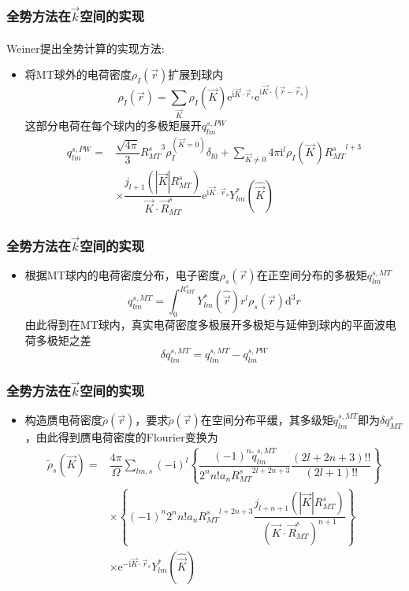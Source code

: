 \documentclass[cjk,slidestop,compress,mathserif,blue]{beamer}
\newcommand{\upcite}[1]{\hspace{0ex}\textsuperscript{\cite{#1}}} %
\begin{document}
\frame
{
	\frametitle{全势方法在$\vec k$空间的实现}
\textrm{Weiner}提出全势计算的实现方法\upcite{JMP22-2433_1981}:~\\
\begin{itemize}
	\item 将\textrm{MT}球外的电荷密度$\rho_I(\vec r)$扩展到球内
	\begin{displaymath}
		\rho_I(\vec r)=\sum_{\vec K}\rho_I(\vec K)\mathrm{e}^{\mathrm{i}\vec K\cdot\vec r_s}\mathrm{e}^{\mathrm{i}\vec K\cdot(\vec r-\vec r_s)}
	\end{displaymath}
	这部分电荷在每个球内的多极矩展开$q_{lm}^{s,PW}$
	\begin{displaymath}
		\begin{aligned}
			q_{lm}^{s,PW}=&\dfrac{\sqrt{4\pi}}3{R_{MT}^s}^3\rho_I^{(\vec K=0)}\delta_{l0}+\sum_{\vec K\neq0}4\pi\mathrm{i}^l\rho_I(\vec K){R_{MT}^s}^{l+3}\\
			&\times\dfrac{j_{l+1}(|\vec K|R_{MT}^s)}{\vec K\cdot\vec R_{MT}^s}\mathrm{e}^{\mathrm{i}\vec K\cdot\vec r_s}Y_{lm}^{\ast}(\hat{\vec K})
		\end{aligned}
	\end{displaymath}
\end{itemize}
}

\frame
{
	\frametitle{全势方法在$\vec k$空间的实现}
\begin{itemize}
	\item 根据\textrm{MT}球内的电荷密度分布，电子密度$\rho_s(\vec r)$在正空间分布的多极矩$q_{lm}^{s,MT}$
\begin{displaymath}
	q_{lm}^{s,MT}=\int_0^{R_{MT}^s}Y_{lm}^{\ast}(\hat{\vec r})r^l\rho_s(\vec r)\mathrm{d}^3r
\end{displaymath}
由此得到在\textrm{MT}球内，真实电荷密度多极展开多极矩与延伸到球内的平面波电荷多极矩之差
	\begin{displaymath}
		\delta q_{lm}^{s,MT}=q_{lm}^{s,MT}-q_{lm}^{s,PW}
	\end{displaymath}
\end{itemize}
}

\frame
{
	\frametitle{全势方法在$\vec k$空间的实现}
\begin{itemize}
	\item 构造赝电荷密度$\tilde\rho(\vec r)$，要求$\tilde\rho(\vec r)$在空间分布平缓，其多级矩$\tilde q_{lm}^{s,MT}$即为$\delta q_{MT}^s$，由此得到赝电荷密度的\textrm{Flourier}变换为
	\begin{displaymath}
		\begin{aligned}
			\tilde\rho_s(\vec K)=&\dfrac{4\pi}{\Omega}\sum_{lm,s}(-\mathrm{i})^l\left\{\dfrac{(-1)^n\tilde q_{lm}^{s,MT}}{2^nn!a_n{R_{MT}^s}^{2l+2n+3}}\dfrac{(2l+2n+3)!!}{(2l+1)!!}\right\}\\
			&\times\left\{(-1)^n2^nn!a_n{R_{MT}^s}^{l+2n+3}\dfrac{j_{l+n+1}(|\vec K|R_{MT}^s)}{(\vec K\cdot\vec R_{MT}^s)^{n+1}}\right\}\\
			&\times\mathrm{e}^{\mathrm{-i}\vec K\cdot\vec r_s}Y_{lm}^{\ast}(\hat{\vec K})
		\end{aligned}
	\end{displaymath}
\end{itemize}
}
\end{document}
